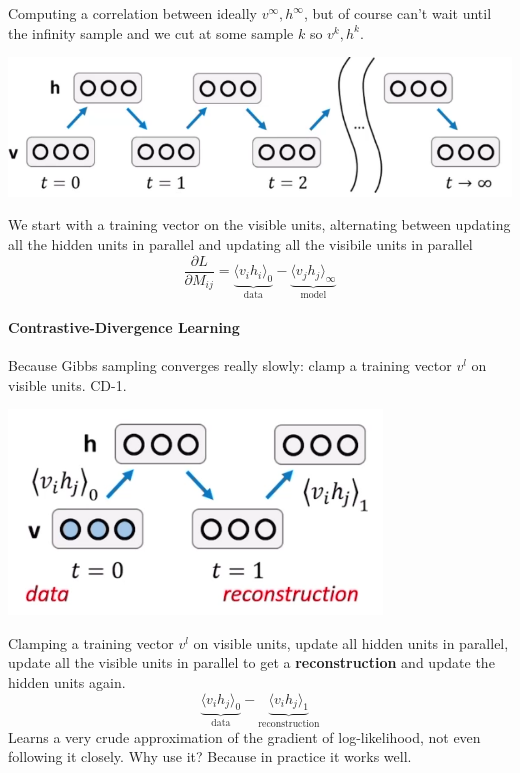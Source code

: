 \documentclass[10pt]{report}
\begin{document}
Computing a correlation between ideally $v^\infty,h^\infty$, but of course can't wait until the infinity sample and we cut at some sample $k$ so $v^k,h^k$.
\begin{center}
	\includegraphics[scale=0.5]{48.png}
\end{center}
We start with a training vector on the visible units, alternating between updating all the hidden units in parallel and updating all the visibile units in parallel
$$\frac{\partial L}{\partial M_{ij}} = \underset{\text{data}}{\underbrace{\langle v_ih_i\rangle_0}} - \underset{\text{model}}{\underbrace{\langle v_jh_j\rangle_\infty}}$$
\paragraph{Contrastive-Divergence Learning} Because Gibbs sampling converges really slowly: clamp a training vector $v^l$ on visible units. CD-1.
\begin{center}
	\includegraphics[scale=0.5]{49.png}
\end{center}
Clamping a training vector $v^l$ on visible units, update all hidden units in parallel, update all the visible units in parallel to get a \textbf{reconstruction} and update the hidden units again.
$$\underset{\text{data}}{\underbrace{\langle v_ih_j\rangle_0}}-\underset{\text{reconstruction}}{\underbrace{\langle v_ih_j\rangle_1}}$$
Learns a very crude approximation of the gradient of log-likelihood, not even following it closely. Why use it? Because in practice it works well.
\end{document}

